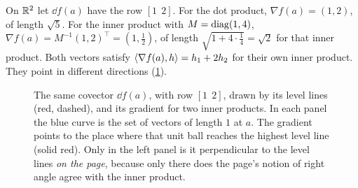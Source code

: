 \begin{notechapter}
\begin{example}\label{gradient-hessian:ex:two}
On $\mathbb{R}^2$ let $\dd f(a)$ have the row $[1\ \ 2]$. For the dot product,
$\nabla f(a) = (1, 2)$, of length $\sqrt5$. For the inner product with
$M = \operatorname{diag}(1, 4)$, $\nabla f(a) = M^{-1}(1, 2)^\top = (1, \frac12)$, of
length $\sqrt{1 + 4\cdot\frac14} = \sqrt2$ for that inner product. Both
vectors satisfy $\left\langle \nabla f(a), h \right\rangle = h_1 + 2h_2$ for their own inner
product. They point in different directions
(\cref{gradient-hessian:fig:two}).
\end{example}

\begin{figure}[ht]
\centering
{}
\caption{The same covector $\dd f(a)$, with row $[1\ \ 2]$, drawn by its
level lines (red, dashed), and its gradient for two inner products. In
each panel the blue curve is the set of vectors of length $1$ at $a$. The
gradient points to the place where that unit ball reaches the highest
level line (solid red). Only in the left panel is it perpendicular to the
level lines \emph{on the page}, because only there does the page's notion
of right angle agree with the inner product.}
\label{gradient-hessian:fig:two}
\end{figure}


\end{notechapter}
